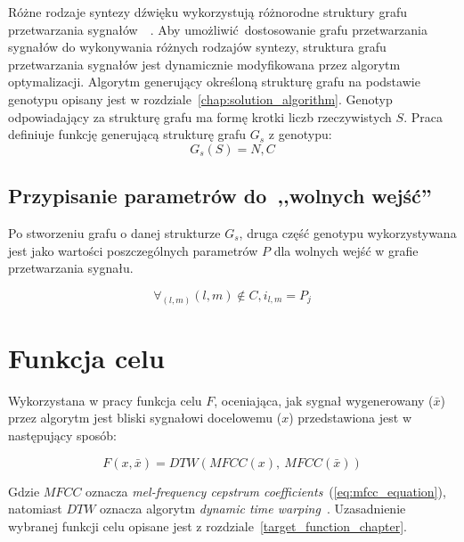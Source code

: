 Różne rodzaje syntezy dźwięku wykorzystują różnorodne struktury grafu przetwarzania
sygnałów~\cite{minilogue_diagram}~\cite{digitone_manual}.
Aby umożliwić dostosowanie grafu przetwarzania sygnałów do wykonywania różnych
rodzajów syntezy, struktura grafu przetwarzania sygnałów jest dynamicznie
modyfikowana przez algorytm optymalizacji. Algorytm generujący określoną
strukturę grafu na podstawie genotypu opisany jest w rozdziale~\ref{chap:solution_algorithm}.
Genotyp odpowiadający za strukturę grafu ma formę krotki liczb rzeczywistych $S$.
Praca definiuje funkcję generującą strukturę grafu $G_s$ z genotypu:
\begin{equation}
  G_s(S) = N, C
  \label{eq:graph_structure_generation_function}
\end{equation}

\subsection{Przypisanie parametrów do~,,wolnych wejść''}\label{sec:graph_params_definition}

Po stworzeniu grafu o danej strukturze $G_s$, druga część genotypu wykorzystywana
jest jako wartości poszczególnych parametrów $P$ dla wolnych wejść w grafie przetwarzania
sygnału.

\begin{equation}
  \forall_{(l,m)} (l, m) \notin C, i_{l,m} = P_j
  \label{eq:graph_params_assignment}
\end{equation}

\section{Funkcja celu}

Wykorzystana w pracy funkcja celu $F$, oceniająca, jak sygnał wygenerowany ($\bar{x}$) przez algorytm
jest bliski sygnałowi docelowemu ($x$) przedstawiona jest w następujący sposób:

\begin{equation}
  F(x, \bar{x}) = DTW(MFCC(x),~MFCC(\bar{x}))
  \label{eq:target_function}
\end{equation}

\noindent
Gdzie $MFCC$ oznacza \textit{mel-frequency cepstrum coefficients}~(\ref{eq:mfcc_equation}), natomiast $DTW$
oznacza algorytm \textit{dynamic time warping}~\cite{mfcc_dtw}. Uzasadnienie wybranej funkcji celu opisane
jest z rozdziale~\ref{target_function_chapter}.


